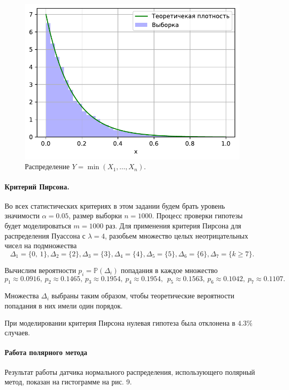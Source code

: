 \documentclass[16pt]{article}
\begin{document}
\begin{figure}[h]
	\center
	\includegraphics[scale=0.7]{3_3.pdf}
	\caption{Распределение $Y = \min(X_1, \ldots, X_n)$.}
\end{figure}

\paragraph{Критерий Пирсона.} Во всех статистических критериях в этом задании будем брать уровень значимости $\alpha = 0.05$, размер выборки $n = 1000$. Процесс проверки гипотезы будет моделироваться $m = 1000$ раз. Для применения критерия Пирсона для распределения Пуассона с $\lambda = 4$, разобьем множество целых неотрицательных чисел на подмножества
$$\Delta_1 = \{0, \ 1\}, \Delta_2 = \{2\}, \Delta_3 = \{3\}, \Delta_4 = \{4\}, \Delta_5 = \{5\}, \Delta_6 = \{6\}, \Delta_7 = \{k \geq 7\}.$$

Вычислим вероятности $p_i = \mathbb{P}(\Delta_i)$ попадания в каждое множество
$$p_1 \approx 0.0916, \ p_2 \approx 0.1465, \ p_3 \approx 0.1954,\  p_4 \approx 0.1954, \ 
\ p_5 \approx 0.1563, \ p_6 \approx 0.1042, \ p_7 \approx 0.1107. $$

Множества $\Delta_i$ выбраны таким образом, чтобы теоретические вероятности попадания в них имели один порядок.

При моделировании критерия Пирсона нулевая гипотеза была отклонена в $4.3\%$ случаев.

\paragraph{Работа полярного метода} Результат работы датчика нормального распределения, использующего полярный метод, показан на гистограмме на рис. 9.
\end{document}
